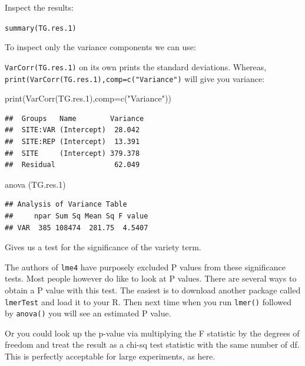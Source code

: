 \documentclass[
]{book}
\makeatletter
\newenvironment{Shaded}{\begin{snugshade}}{\end{snugshade}}
\newcommand{\AttributeTok}[1]{\textcolor[rgb]{0.77,0.63,0.00}{#1}}
\newcommand{\FloatTok}[1]{\textcolor[rgb]{0.00,0.00,0.81}{#1}}
\newcommand{\FunctionTok}[1]{\textcolor[rgb]{0.00,0.00,0.00}{#1}}
\newcommand{\NormalTok}[1]{#1}
\newcommand{\StringTok}[1]{\textcolor[rgb]{0.31,0.60,0.02}{#1}}
\newenvironment{kframe}{%
\medskip{}
\setlength{\fboxsep}{.8em}
 \def\at@end@of@kframe{}%
 \ifinner\ifhmode%
  \def\at@end@of@kframe{\end{minipage}}%
  \begin{minipage}{\columnwidth}%
 \fi\fi%
 \def\FrameCommand##1{\hskip\@totalleftmargin \hskip-\fboxsep
 \colorbox{shadecolor}{##1}\hskip-\fboxsep
     \hskip-\linewidth \hskip-\@totalleftmargin \hskip\columnwidth}%
 \MakeFramed {\advance\hsize-\width
   \@totalleftmargin\z@ \linewidth\hsize
   \@setminipage}}%
 {\par\unskip\endMakeFramed%
 \at@end@of@kframe}
\newenvironment{rmdblock}[1]
  {
  \begin{itemize}
  \renewcommand{\labelitemi}{
    \raisebox{-.7\height}[0pt][0pt]{
      {\setkeys{Gin}{width=3em,keepaspectratio}\texttt{[image: images/\#1]}}
    }
  }
  \setlength{\fboxsep}{1em}
  \begin{kframe}
  \item
  }
  {
  \end{kframe}
  \end{itemize}
  }
\newenvironment{rmdnote}
  {\begin{rmdblock}{note}}
  {\end{rmdblock}}
\makeatother
\begin{document}
Inspect the results:

\texttt{summary(TG.res.1)}

To inspect only the variance components we can use:

\texttt{VarCorr(TG.res.1)} on its own prints the standard deviations. Whereas, \texttt{print(VarCorr(TG.res.1),comp=c("Variance")} will give you variance:

\begin{Shaded}
\begin{Highlighting}[]
\FunctionTok{print}\NormalTok{(}\FunctionTok{VarCorr}\NormalTok{(TG.res}\FloatTok{.1}\NormalTok{),}\AttributeTok{comp=}\FunctionTok{c}\NormalTok{(}\StringTok{"Variance"}\NormalTok{))}
\end{Highlighting}
\end{Shaded}

\begin{verbatim}
##  Groups   Name        Variance
##  SITE:VAR (Intercept)  28.042 
##  SITE:REP (Intercept)  13.391 
##  SITE     (Intercept) 379.378 
##  Residual              62.049
\end{verbatim}

\begin{Shaded}
\begin{Highlighting}[]
\FunctionTok{anova}\NormalTok{ (TG.res}\FloatTok{.1}\NormalTok{)}
\end{Highlighting}
\end{Shaded}

\begin{verbatim}
## Analysis of Variance Table
##     npar Sum Sq Mean Sq F value
## VAR  385 108474  281.75  4.5407
\end{verbatim}

Gives us a test for the significance of the variety term.

\begin{rmdnote}
The authors of \texttt{lme4} have purposely excluded P values from these significance tests. Most people however do like to look at P values. There are several ways to obtain a P value with this test. The easiest is to download another package called \texttt{lmerTest} and load it to your R. Then next time when you run \texttt{lmer()} followed by \texttt{anova()} you will see an estimated P value.

Or you could look up the p-value via multiplying the F statistic by the degrees of freedom and treat the result as a chi-sq test statistic with the same number of df. This is perfectly acceptable for large experiments, as here.
\end{rmdnote}
\end{document}
